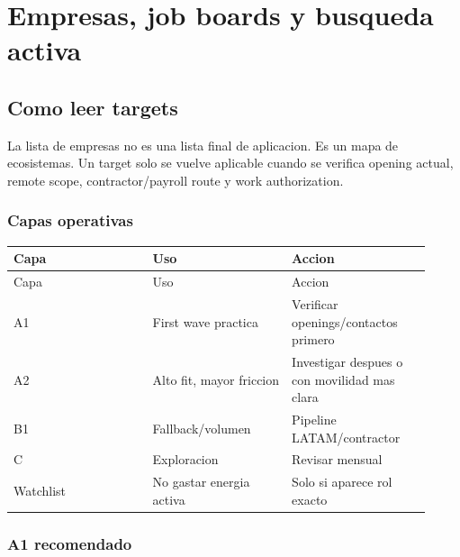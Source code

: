 \chapter{Empresas, job boards y busqueda activa}

\section{Como leer targets}


La lista de empresas no es una lista final de aplicacion. Es un mapa de ecosistemas. Un target solo se vuelve aplicable cuando se verifica opening actual, remote scope, contractor/payroll route y work authorization.


\subsection{Capas operativas}


\begin{center}
\scriptsize
\begin{longtable}{>{\raggedright\arraybackslash}p{0.305\linewidth} >{\raggedright\arraybackslash}p{0.305\linewidth} >{\raggedright\arraybackslash}p{0.305\linewidth}}
\toprule
Capa & Uso & Accion \\
\midrule
\endfirsthead
\toprule
Capa & Uso & Accion \\
\midrule
\endhead
A1 & First wave practica & Verificar openings/contactos primero \\
A2 & Alto fit, mayor friccion & Investigar despues o con movilidad mas clara \\
B1 & Fallback/volumen & Pipeline LATAM/contractor \\
C & Exploracion & Revisar mensual \\
Watchlist & No gastar energia activa & Solo si aparece rol exacto \\
\bottomrule
\end{longtable}
\end{center}


\subsection{A1 recomendado}


